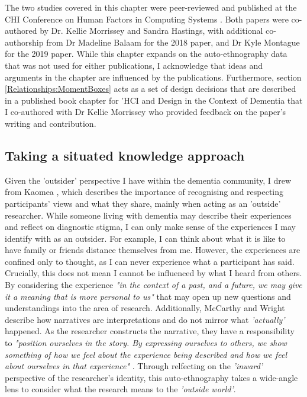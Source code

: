 The two studies covered in this chapter were peer-reviewed and published at the CHI Conference on Human Factors in Computing Systems \citep{hodge_exploring_2018,hodge_exploring_2019}. Both papers were co-authored by Dr. Kellie Morrissey and Sandra Hastings, with additional co-authorship from Dr Madeline Balaam for the 2018 paper, and Dr Kyle Montague for the 2019 paper. While this chapter expands on the auto-ethnography data that was not used for either publications, I acknowledge that ideas and arguments in the chapter are influenced by the publications. Furthermore, section \ref{Relationships:MomentBoxes} acts as a set of design decisions that are described in a published book chapter for 'HCI and Design in the Context of Dementia \citep{hodge2020sharing} that I co-authored with Dr Kellie Morrissey who provided feedback on the paper's writing and contribution. 

\subsection{Taking a situated knowledge approach}
\label{Relationships-Intro:SituatedKnowledge}
Given the 'outsider' perspective I have within the dementia community, I drew from Kaomea \citep{kaomea_dilemmas_2001}, which describes the importance of recognising and respecting participants' views and what they share, mainly when acting as an 'outside' researcher. While someone living with dementia may describe their experiences and reflect on diagnostic stigma, I can only make sense of the experiences I may identify with as an outsider. For example, I can think about what it is like to have family or friends distance themselves from me. However, the experiences are confined only to thought, as I can never experience what a participant has said. Crucially, this does not mean I cannot be influenced by what I heard from others. By considering the experience \textit{"in the context of a past, and a future, we may give it a meaning that is more personal to us"} \citep{mccarthy_technology_2007} that may open up new questions and understandings into the area of research. Additionally, McCarthy and Wright describe how narratives are interpretations and do not mirror what \textit{'actually'} happened. As the researcher constructs the narrative, they have a responsibility to \textit{"position ourselves in the story. By expressing ourselves to others, we show something of how we feel about the experience being described and how we feel about ourselves in that experience"} \citep{mccarthy_technology_2007}. Through relfecting on the \textit{'inward'} perspective of the researcher's identity, this auto-ethnography takes a wide-angle lens \citep{ellis_heartful_2016} to consider what the research means to the \textit{'outside world'}.

